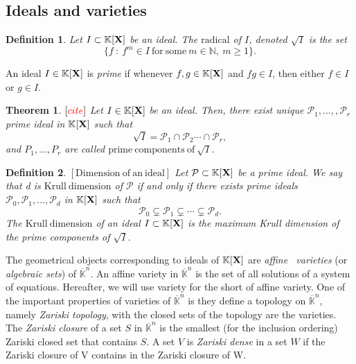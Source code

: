 \documentclass[11pt]{article}
\numberwithin{Property}{section}
\newtheorem{Theorem}{Theorem}%
\numberwithin{Theorem}{section}
\numberwithin{Proposition}{section}
\numberwithin{Lemma}{section}
\numberwithin{Corollary}{section}
\newtheorem{Definition}{Definition}%
\numberwithin{Definition}{section}
\numberwithin{Remark}{section}
\numberwithin{Conjecture}{section}
\numberwithin{Problem}{section}
\numberwithin{Example}{section}
\numberwithin{Claim}{section}
\renewcommand{\geq}{\geqslant}
\def\bar{\overline}
\newcommand{\field}{\mathbb{K}} %
\newcommand{\mat}[1]{\mathbf{\MakeUppercase{#1}}} %
\newcommand{\todo}[1]{\textcolor{red}{#1}} %
\begin{document}
\subsection{Ideals and varieties}
\begin{Definition} Let $I \subset \field[\mat{X}]$ be an ideal. The $\mathrm{radical}$ of $I$, denoted $\sqrt{I}$ is the set 
\[
\{f \ : \ f^m \in I \ \mathrm{for \ some} \ m \in \mathbb{N}, \ m \geq 1\}.
\]
\end{Definition}
An ideal $I \in \field[\mat{X}]$ is \emph{prime} if whenever $f,g \in \field[\mat{X}]$ and $fg \in I$, then either $f \in I$ or $g \in I$. 
\begin{Theorem}$[\todo{cite}]$ Let $I \in \field[\mat{X}]$ be an ideal. Then, there exist unique $\mathcal{P}_1, \ldots,, \mathcal{P}_r$ prime ideal in $\field[\mat{X}]$ such that 
\[
\sqrt{I} = \mathcal{P}_1 \cap \mathcal{P}_2 \cdots \cap \mathcal{P}_r,
\]
and $P_1, \ldots, P_r$ are called $\mathrm{prime \ components \ of} \ \sqrt{I}$. 
\end{Theorem}
\begin{Definition} $\mathrm{[Dimension \ of \ an \ ideal]}$ Let $\mathcal{P} \subset \field[\mat{X}]$ be a prime ideal. We say that d is $\mathrm{Krull \ dimension }$ of $\mathcal{P}$ if and only if there exists prime ideals $\mathcal{P}_0, \mathcal{P}_1, \ldots, \mathcal{P}_d$ in $\field[\mat{X}]$ such that 
\[
\mathcal{P}_0 \subsetneq \mathcal{P}_1 \subsetneq \cdots \subsetneq \mathcal{P}_d.
\] 
The $\mathrm{Krull \ dimension}$ of an ideal $I \subset \field[\mat{X}]$ is the maximum Krull dimension of the prime components of $\sqrt{I}$. 
\end{Definition}
The geometrical objects corresponding to ideals of $\field[\mat{X}]$ are \emph{affine \ varieties} (or \emph{algebraic sets}) of $\bar{\field}^n$. An affine variety in $\bar{\field}^n$ is the set of all solutions of a system of equations. Hereafter, we will use variety for the short of affine variety. One of the important properties of varieties of $\bar{\field}^n$ is they define a topology on $\bar{\field}^n$, namely \emph{Zariski topology}, with the closed sets of the topology are the varieties. The \emph{Zariski closure} of a set $S$ in $\bar{\field}^n$ is the smallest (for the inclusion ordering) Zariski closed set that contains $S$. A set $V$ is \emph{Zariski dense} in a set $W$ if the Zariski closure of V contains in the Zariski closure of W. 
\end{document}
